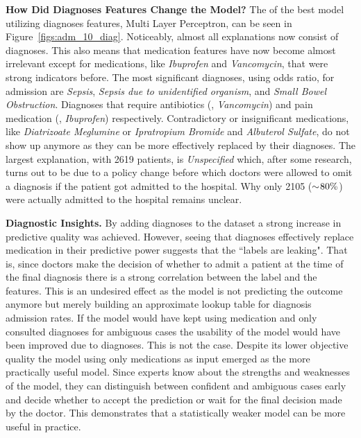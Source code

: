\par \noindent \textbf{How Did Diagnoses Features Change the Model?}
The \tabB of the best model utilizing diagnoses features, Multi Layer Perceptron, can be seen in Figure~\ref{figs:adm_10_diag}.
Noticeably, almost all explanations now consist of diagnoses.
This also means that medication features have now become almost irrelevant except for medications, like \emph{Ibuprofen} and \emph{Vancomycin}, that were strong indicators before.
The most significant diagnoses, using odds ratio, for admission are \emph{Sepsis}, \emph{Sepsis due to unidentified organism}, and \emph{Small Bowel Obstruction}.
Diagnoses that require antibiotics (\eg, \emph{Vancomycin}) and pain medication (\eg, \emph{Ibuprofen}) respectively.
Contradictory or insignificant medications, like \emph{Diatrizoate Meglumine} or \emph{Ipratropium Bromide} and \emph{Albuterol Sulfate}, do not show up anymore as they can be more effectively replaced by their diagnoses.
The largest explanation, with 2619 patients, is \emph{Unspecified} which, after some research, turns out to be due to a policy change before which doctors were allowed to omit a diagnosis if the patient got admitted to the hospital.
Why only 2105 ($\sim\hspace{-0.2em}80\%$) were actually admitted to the hospital remains unclear.



\par \noindent \textbf{Diagnostic Insights.}
By adding diagnoses to the dataset a strong increase in predictive quality was achieved.
However, seeing that diagnoses effectively replace medication in their predictive power suggests that the ``labels are leaking".
That is, since doctors make the decision of whether to admit a patient at the time of the final diagnosis there is a strong correlation between the label and the features.
This is an undesired effect as the model is not predicting the outcome anymore but merely building an approximate lookup table for diagnosis admission rates.
If the model would have kept using medication and only consulted diagnoses for ambiguous cases the usability of the model would have been improved due to diagnoses.
This is not the case.
Despite its lower objective quality the model using only medications as input emerged as the more practically useful model.
Since experts know about the strengths and weaknesses of the model, they can distinguish between confident and ambiguous cases early and decide whether to accept the prediction or wait for the final decision made by the doctor.
This demonstrates that a statistically weaker model can be more useful in practice.

